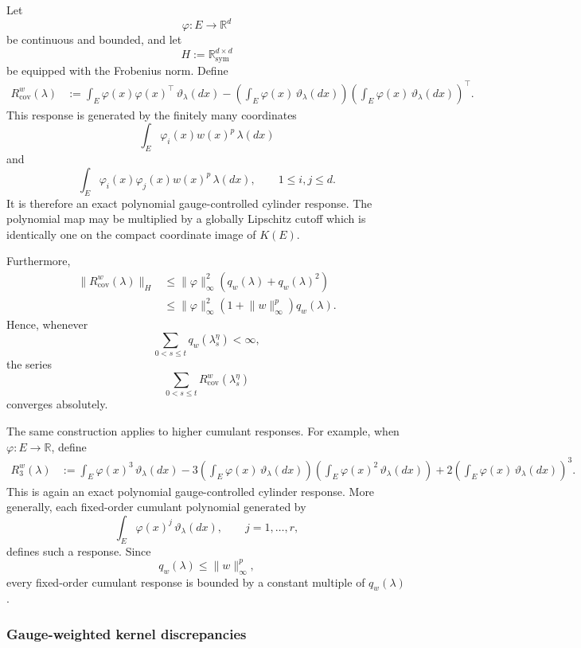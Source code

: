 \documentclass[a4paper,10pt]{article}
\begin{document}
Let
\[
        \varphi:E\longrightarrow\mathbb R^d
\]
be continuous and bounded, and let
\[
        H:=\mathbb R_{\mathrm{sym}}^{d\times d}
\]
be equipped with the Frobenius norm. Define
\[
\begin{aligned}
R_{\operatorname{cov}}^w(\lambda)
&:=
\int_E
\varphi(x)\varphi(x)^\top\,\vartheta_\lambda(dx)
-
\left(
\int_E\varphi(x)\,\vartheta_\lambda(dx)
\right)
\left(
\int_E\varphi(x)\,\vartheta_\lambda(dx)
\right)^\top.
\end{aligned}
\]
This response is generated by the finitely many coordinates
\[
\int_E
\varphi_i(x)w(x)^p\,\lambda(dx)
\]
and
\[
\int_E
\varphi_i(x)\varphi_j(x)w(x)^p\,\lambda(dx),
\qquad 1\le i,j\le d.
\]
It is therefore an exact polynomial gauge-controlled cylinder
response. The polynomial map may be multiplied by a globally
Lipschitz cutoff which is identically one on the compact coordinate
image of \(K(E)\).

Furthermore,
\[
\begin{aligned}
\lVert R_{\operatorname{cov}}^w(\lambda)\rVert_H
&\le
\lVert\varphi\rVert_\infty^2
\left(
q_w(\lambda)+q_w(\lambda)^2
\right)
\\
&\le
\lVert\varphi\rVert_\infty^2
\left(
1+\lVert w\rVert_\infty^p
\right)
q_w(\lambda).
\end{aligned}
\]
Hence, whenever
\[
        \sum_{0<s\le t}q_w(\lambda_s^\eta)<\infty,
\]
the series
\[
        \sum_{0<s\le t}
        R_{\operatorname{cov}}^w(\lambda_s^\eta)
\]
converges absolutely.

The same construction applies to higher cumulant responses. For
example, when \(\varphi:E\to\mathbb R\), define
\[
\begin{aligned}
R_3^w(\lambda)
&:=
\int_E\varphi(x)^3\,\vartheta_\lambda(dx)
-
3
\left(
\int_E\varphi(x)\,\vartheta_\lambda(dx)
\right)
\left(
\int_E\varphi(x)^2\,\vartheta_\lambda(dx)
\right)
+
2
\left(
\int_E\varphi(x)\,\vartheta_\lambda(dx)
\right)^3.
\end{aligned}
\]
This is again an exact polynomial gauge-controlled cylinder response.
More generally, each fixed-order cumulant polynomial generated by
\[
        \int_E\varphi(x)^j\,\vartheta_\lambda(dx),
        \qquad j=1,\ldots,r,
\]
defines such a response. Since
\[
        q_w(\lambda)\le\lVert w\rVert_\infty^p,
\]
every fixed-order cumulant response is bounded by a constant multiple
of \(q_w(\lambda)\).

\subsubsection{Gauge-weighted kernel discrepancies}
\end{document}
